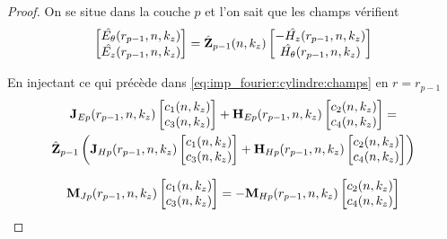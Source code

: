     \begin{proof}
      On se situe dans la couche \(p\) et l'on sait que les champs vérifient
      \begin{equation}
        \begin{bmatrix}
          \hat{E_\theta}(r_{p-1},n,k_z)\\
          \hat{E_z}(r_{p-1},n,k_z)\\
        \end{bmatrix}
        =
        \hat {\mathbf{Z}}_{p-1}(n,k_z)
        \begin{bmatrix}
          -\hat{H_z}(r_{p-1},n,k_z)\\
          \hat{H_\theta}(r_{p-1},n,k_z)\\
        \end{bmatrix}
      \end{equation}

      En injectant ce qui précède dans \eqref{eq:imp_fourier:cylindre:champs} en \(r = r_{p-1}\)
      \begin{multline}
        \mathbf{J}_{Ep}(r_{p-1},n,k_z)
        \begin{bmatrix}
          c_1(n,k_z) \\
          c_3(n,k_z)
        \end{bmatrix}
        +
        \mathbf{H}_{Ep}(r_{p-1},n,k_z)
        \begin{bmatrix}
          c_2(n,k_z) \\
          c_4(n,k_z)
        \end{bmatrix}
        =
        \\
        \hat {\mathbf{Z}}_{p-1}
        \left(
          \mathbf{J}_{Hp}(r_{p-1},n,k_z)
          \begin{bmatrix}
            c_1(n,k_z) \\
            c_3(n,k_z)
          \end{bmatrix}
          +
          \mathbf{H}_{Hp}(r_{p-1},n,k_z)
          \begin{bmatrix}
            c_2(n,k_z) \\
            c_4(n,k_z)
          \end{bmatrix}
        \right)
      \end{multline}

      \begin{equation}
        \mathbf{M}_{Jp}(r_{p-1},n,k_z)
        \begin{bmatrix}
          c_1(n,k_z) \\
          c_3(n,k_z)
        \end{bmatrix}
        =
        -\mathbf{M}_{Hp}(r_{p-1},n,k_z)
        \begin{bmatrix}
          c_2(n,k_z) \\
          c_4(n,k_z)
        \end{bmatrix}
      \end{equation}


\end{proof}
